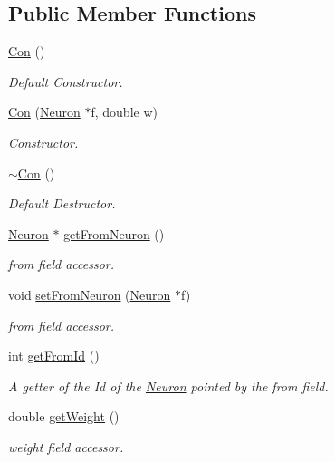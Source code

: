 \subsection*{Public Member Functions}
\begin{DoxyCompactItemize}
\item 
\hyperlink{class_con_a61621054cc1ee979385c81207ee0bceb}{Con} ()
\begin{DoxyCompactList}\small\item\em Default Constructor. \end{DoxyCompactList}\item 
\hyperlink{class_con_ab2dab438086fc1bb26755dfecb2d2476}{Con} (\hyperlink{class_neuron}{Neuron} $\ast$f, double w)
\begin{DoxyCompactList}\small\item\em Constructor. \end{DoxyCompactList}\item 
\hyperlink{class_con_a703b044611253c7a0a9e057ed62a3d22}{$\sim$Con} ()
\begin{DoxyCompactList}\small\item\em Default Destructor. \end{DoxyCompactList}\item 
\hyperlink{class_neuron}{Neuron} $\ast$ \hyperlink{class_con_a970a74ffcba9433d6f383ecab398f25f}{getFromNeuron} ()
\begin{DoxyCompactList}\small\item\em from field accessor. \end{DoxyCompactList}\item 
void \hyperlink{class_con_a19ca0a1d257a3f002693a441db03aeb4}{setFromNeuron} (\hyperlink{class_neuron}{Neuron} $\ast$f)
\begin{DoxyCompactList}\small\item\em from field accessor. \end{DoxyCompactList}\item 
int \hyperlink{class_con_aad72314592bebdcae6c68a67d2b4a505}{getFromId} ()
\begin{DoxyCompactList}\small\item\em A getter of the Id of the \hyperlink{class_neuron}{Neuron} pointed by the from field. \end{DoxyCompactList}\item 
double \hyperlink{class_con_a385c5bf6eb9e2ffc94c5b427c287ccb2}{getWeight} ()
\begin{DoxyCompactList}\small\item\em weight field accessor. \end{DoxyCompactList}\item 

\end{DoxyCompactItemize}
